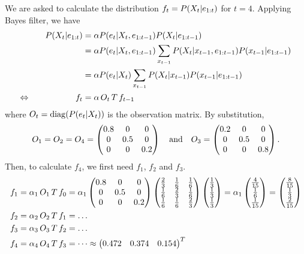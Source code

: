 \documentclass[11pt, a4paper]{article}
\begin{document}
\begin{enumerate}
    \begin{solution}
        We are asked to calculate the distribution $f_t = P(X_t \vert e_{1:t})$ for $t = 4$. Applying Bayes filter, we have
        \begin{alignat*}{2}
            && P(X_t \vert e_{1:t}) & = \alpha P(e_t \vert X_t, e_{1:t-1}) P(X_t \vert e_{1:t-1}) \\
            &&& = \alpha P(e_t \vert X_t, e_{1:t-1}) \sum_{x_{t-1}} P(X_t \vert x_{t-1}, e_{1:t-1}) P(x_{t-1} \vert e_{1:t-1}) \\
            &&& = \alpha P(e_t \vert X_t) \sum_{x_{t-1}} P(X_t \vert x_{t-1}) P(x_{t-1} \vert e_{1:t-1}) \\
            \Leftrightarrow \quad && f_t & = \alpha \, O_t \, T \, f_{t-1}
        \end{alignat*}
        where $O_t = \operatorname{diag}(P(e_t | X_t))$ is the observation matrix. By substitution,
        \begin{equation*}
                O_1 = O_2 = O_4 = \begin{pmatrix}0.8 & 0 & 0 \\ 0 & 0.5 & 0 \\ 0 & 0 & 0.2\end{pmatrix} \quad \text{and} \quad O_3 = \begin{pmatrix}0.2 & 0 & 0 \\ 0 & 0.5 & 0 \\ 0 & 0 & 0.8\end{pmatrix} .
        \end{equation*}
        Then, to calculate $f_4$, we first need $f_1$, $f_2$ and $f_3$.
        \begin{align*}
            f_1 & = \alpha_1 \, O_1 \, T \, f_0 = \alpha_1 \begin{pmatrix}0.8 & 0 & 0 \\ 0 & 0.5 & 0 \\ 0 & 0 & 0.2\end{pmatrix} \begin{pmatrix}
                \frac{2}{3} & \frac{1}{6} & \frac{1}{6} \\
                \frac{1}{6} & \frac{2}{3} & \frac{1}{6} \\
                \frac{1}{6} & \frac{1}{6} & \frac{2}{3}
            \end{pmatrix} \begin{pmatrix}\frac{1}{3} \\ \frac{1}{3} \\ \frac{1}{3}\end{pmatrix} = \alpha_1 \begin{pmatrix}\frac{4}{15} \\ \frac{1}{6} \\ \frac{1}{15}\end{pmatrix} = \begin{pmatrix}\frac{8}{15} \\ \frac{1}{3} \\ \frac{2}{15}\end{pmatrix} \\
            f_2 & = \alpha_2 \, O_2 \, T \, f_1 = \dots \\
            f_3 & = \alpha_3 \, O_3 \, T \, f_2 = \dots \\
            f_4 & = \alpha_4 \, O_4 \, T \, f_3 = \dots \approx \begin{pmatrix}0.472 & 0.374 & 0.154\end{pmatrix}^T
        \end{align*}
    \end{solution}


\end{enumerate}
\end{document}
